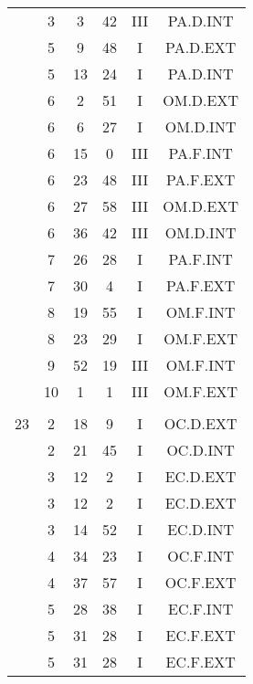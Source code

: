 \documentclass[12pt, a4paper]{article}
\begin{document}
\begin{multicols}{3}
{\begin{tabular}{c c c c c c}
	 	 	 	 & 3 & 3 & 42 & III & PA.D.INT\\%
	 	 	 	 & 5 & 9 & 48 & I & PA.D.EXT\\%
	 	 	 	 & 5 & 13 & 24 & I & PA.D.INT\\%
	 	 	 	 & 6 & 2 & 51 & I & OM.D.EXT\\%
	 	 	 	 & 6 & 6 & 27 & I & OM.D.INT\\%
	 	 	 	 & 6 & 15 & 0 & III & PA.F.INT\\%
	 	 	 	 & 6 & 23 & 48 & III & PA.F.EXT\\%
	 	 	 	 & 6 & 27 & 58 & III & OM.D.EXT\\%
	 	 	 	 & 6 & 36 & 42 & III & OM.D.INT\\%
	 	 	 	 & 7 & 26 & 28 & I & PA.F.INT\\%
	 	 	 	 & 7 & 30 & 4 & I & PA.F.EXT\\%
	 	 	 	 & 8 & 19 & 55 & I & OM.F.INT\\%
	 	 	 	 & 8 & 23 & 29 & I & OM.F.EXT\\%
	 	 	 	 & 9 & 52 & 19 & III & OM.F.INT\\%
	 	 	 	 & 10 & 1 & 1 & III & OM.F.EXT\\%
	 	 	 	 & & & & & \\%
	 	 	 	23 & 2 & 18 & 9 & I & OC.D.EXT\\%
	 	 	 	 & 2 & 21 & 45 & I & OC.D.INT\\%
	 	 	 	 & 3 & 12 & 2 & I & EC.D.EXT\\%
	 	 	 	 & 3 & 12 & 2 & I & EC.D.EXT\\%
	 	 	 	 & 3 & 14 & 52 & I & EC.D.INT\\%
	 	 	 	 & 4 & 34 & 23 & I & OC.F.INT\\%
	 	 	 	 & 4 & 37 & 57 & I & OC.F.EXT\\%
	 	 	 	 & 5 & 28 & 38 & I & EC.F.INT\\%
	 	 	 	 & 5 & 31 & 28 & I & EC.F.EXT\\%
	 	 	 	 & 5 & 31 & 28 & I & EC.F.EXT\\%
	 	 \end{tabular}
 	}
\end{multicols}
\end{document}
